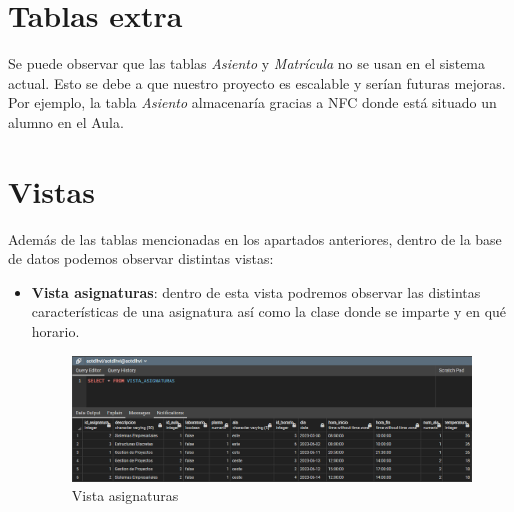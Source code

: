 \documentclass[12pt]{report}
\begin{document}
\section{Tablas extra}
Se puede observar que las tablas \textit{Asiento} y \textit{Matrícula} no se usan en el sistema actual. Esto se debe a que nuestro proyecto es escalable y serían futuras mejoras. Por ejemplo, la tabla \textit{Asiento} almacenaría gracias a NFC donde está situado un alumno en el Aula.
\newpage
\section{Vistas}
Además de las tablas mencionadas en los apartados anteriores, dentro de la base de datos podemos observar distintas vistas:
\begin{itemize}
    \item \textbf{Vista asignaturas}: dentro de esta vista podremos observar las distintas características de una asignatura así como la clase donde se imparte y en qué horario.
    \begin{figure}[H]
        \centering
        \includegraphics[scale = 0.55]{imagenes//base_de_datos/Vista_asignaturas.png}
        \caption{Vista asignaturas}
        \label{fig:Figura}
    \end{figure}
    

\end{itemize}
\end{document}
